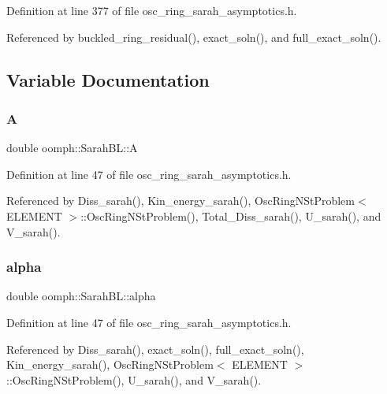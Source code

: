 Definition at line 377 of file osc\+\_\+ring\+\_\+sarah\+\_\+asymptotics.\+h.



Referenced by buckled\+\_\+ring\+\_\+residual(), exact\+\_\+soln(), and full\+\_\+exact\+\_\+soln().



\subsection{Variable Documentation}
\mbox{\label{namespaceoomph_1_1SarahBL_a5b48abf91ca062e8bfeab87f1d4a9499}} 
\subsubsection{\texorpdfstring{A}{A}}
{\footnotesize\ttfamily double oomph\+::\+Sarah\+B\+L\+::A}



Definition at line 47 of file osc\+\_\+ring\+\_\+sarah\+\_\+asymptotics.\+h.



Referenced by Diss\+\_\+sarah(), Kin\+\_\+energy\+\_\+sarah(), Osc\+Ring\+N\+St\+Problem$<$ E\+L\+E\+M\+E\+N\+T $>$\+::\+Osc\+Ring\+N\+St\+Problem(), Total\+\_\+\+Diss\+\_\+sarah(), U\+\_\+sarah(), and V\+\_\+sarah().

\mbox{\label{namespaceoomph_1_1SarahBL_ab07de8eb877306afdc10ba4a17c6406b}} 
\subsubsection{\texorpdfstring{alpha}{alpha}}
{\footnotesize\ttfamily double oomph\+::\+Sarah\+B\+L\+::alpha}



Definition at line 47 of file osc\+\_\+ring\+\_\+sarah\+\_\+asymptotics.\+h.



Referenced by Diss\+\_\+sarah(), exact\+\_\+soln(), full\+\_\+exact\+\_\+soln(), Kin\+\_\+energy\+\_\+sarah(), Osc\+Ring\+N\+St\+Problem$<$ E\+L\+E\+M\+E\+N\+T $>$\+::\+Osc\+Ring\+N\+St\+Problem(), U\+\_\+sarah(), and V\+\_\+sarah().

